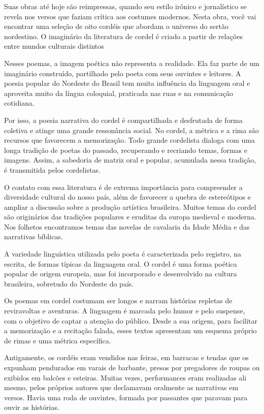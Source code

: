 \documentclass[12pt]{extarticle}
\begin{document}
Suas obras até hoje são reimpressas, quando seu estilo irônico e jornalístico se revela nos versos que faziam crítica aos costumes modernos. Nesta obra, você vai encontrar uma seleção de oito cordéis  que abordam o universo do sertão nordestino. O imaginário da literatura de cordel é criado a partir de relações entre mundos culturais distintos  

Nesses poemas, a imagem poética não representa a realidade. Ela faz parte de um imaginário construído, partilhado pelo poeta com seus ouvintes e leitores. A poesia popular do Nordeste do Brasil tem muita influência da linguagem oral e aproveita muito da língua coloquial, praticada nas ruas e na comunicação cotidiana.

Por isso, a poesia narrativa do cordel é compartilhada e desfrutada de forma coletiva e atinge uma grande ressonância social. No cordel, a métrica e a rima são recursos que favorecem a memorização. Todo grande cordelista dialoga com uma longa tradição de poetas do passado, recuperando e recriando temas, formas e imagens. Assim, a sabedoria de matriz oral e popular, acumulada nessa tradição, é transmitida pelos cordelistas. 

O contato com essa literatura é de extrema importância para compreender a diversidade cultural do nosso país, além de favorecer a quebra de estereótipos e ampliar a discussão sobre a produção artística brasileira. Muitos temas do cordel são originários das tradições populares e eruditas da europa medieval e moderna. Nos folhetos encontramos temas das novelas de cavalaria da Idade Média e das narrativas bíblicas.

A variedade linguística utilizada pelo poeta é caracterizada pelo registro, na escrita, de formas típicas da linguagem oral. O cordel é uma forma poética popular de origem europeia, mas foi incorporado e desenvolvido na cultura brasileira, sobretudo do Nordeste do país.

Os poemas em cordel costumam ser longos e narram histórias repletas de reviravoltas e aventuras. A linguagem é marcada pelo humor e pelo suspense, com o objetivo de captar a atenção do público. Desde a sua origem, para facilitar a memorização e a recitação falada, esses textos apresentam um esquema próprio de rimas e uma métrica específica. 

Antigamente, os cordéis eram vendidos nas feiras, em barracas e tendas que os expunham pendurados em varais de barbante, presos por pregadores de roupas ou exibidos em balcões e esteiras. Muitas vezes, performances eram realizadas ali mesmo, pelos próprios autores que declamavam oralmente as narrativas em versos. Havia uma roda de ouvintes, formada por passantes que paravam para ouvir as histórias.
\end{document}
